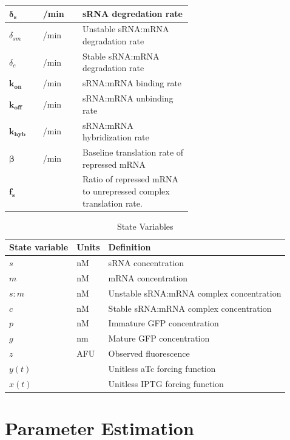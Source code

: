 \documentclass[10pt,journal]{./IEEE_latex_class/IEEEtran}
\begin{document}
\begin{table}[h]
\begin{tabular}{| l | l | p{0.6\linewidth} |}
\hline $\boldsymbol{\delta_{s}}$ &  /min & sRNA degredation rate  \\
\hline $\delta_{sm}$ &  /min & Unstable sRNA:mRNA degradation rate  \\
\hline $\delta_{c}$ &  /min & Stable sRNA:mRNA degradation rate  \\
\hline $\boldsymbol{k_{on}}$ &   /min & sRNA:mRNA binding rate \\
\hline $\boldsymbol{k_{off}}$ &  /min & sRNA:mRNA unbinding rate \\
\hline $\boldsymbol{k_{hyb}}$ &  /min & sRNA:mRNA hybridization rate \\
\hline $\boldsymbol{\beta}$ &   /min & Baseline translation rate of repressed mRNA \\
\hline $\boldsymbol{f_{s}}$ & & Ratio of repressed mRNA to unrepressed complex translation rate. \\
\hline
\end{tabular}
\end{table}

\begin{table}[h]
\renewcommand{\arraystretch}{1.3}
\caption{State Variables}
\label{StateVariables}
\centering
\begin{tabular}{| l | l | l|}
\hline \textbf{State variable} & Units &  \textbf{Definition}  \\
\hline\hline $s$  & nM & sRNA concentration \\
\hline $m$ & nM & mRNA concentration  \\
\hline $s:m$ &  nM & Unstable sRNA:mRNA complex concentration  \\
\hline $c$ &  nM & Stable sRNA:mRNA complex concentration  \\
\hline $p$ & nM & Immature GFP concentration  \\
\hline $g$ &  nm & Mature GFP concentration  \\
\hline $z$ & AFU & Observed fluorescence  \\
\hline $y(t)$ & & Unitless aTc forcing function  \\
\hline $x(t)$ &  & Unitless IPTG forcing function  \\
\hline
\end{tabular}
\end{table}





\section{Parameter Estimation}
\label{Parameter Estimation}
\end{document}
